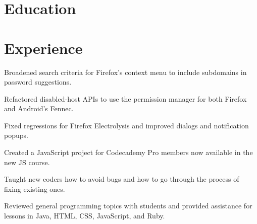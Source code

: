 \documentclass[a4paper]{deedy-resume-openfont}
\begin{document}
%
%


%
%
\section{Education}

  \hfill {}
\sectionsep

%
%
\section{Experience}

  \hfill {}
\begin{tightemize}
\item Broadened search criteria for Firefox’s context menu to include subdomains in password suggestions.
\item Refactored disabled-host APIs to use the permission manager for both Firefox and Android’s Fennec.
\item Fixed regressions for Firefox Electrolysis and improved dialogs and notification popups.
\end{tightemize}
\sectionsep

  \hfill {}
\begin{tightemize}
\item Created a JavaScript project for Codecademy Pro members now available in the new JS course.
\item Taught new coders how to avoid bugs and how to go through the process of fixing existing ones.
\item Reviewed general programming topics with students and provided assistance for lessons in Java, HTML, CSS, JavaScript, and Ruby.
\end{tightemize}
\sectionsep
\end{document}
